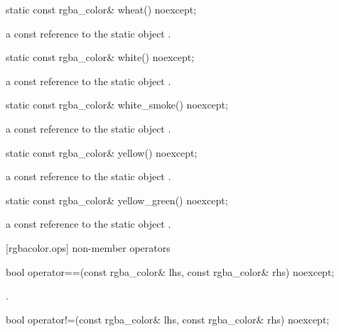 \begin{itemdecl}
static const rgba_color& wheat() noexcept;
\end{itemdecl}
\begin{itemdescr}
\pnum
\returns
a const reference to the static  object .
\end{itemdescr}

\begin{itemdecl}
static const rgba_color& white() noexcept;
\end{itemdecl}
\begin{itemdescr}
\pnum
\returns
a const reference to the static  object .
\end{itemdescr}

\begin{itemdecl}
static const rgba_color& white_smoke() noexcept;
\end{itemdecl}
\begin{itemdescr}
\pnum
\returns
a const reference to the static  object .
\end{itemdescr}

\begin{itemdecl}
static const rgba_color& yellow() noexcept;
\end{itemdecl}
\begin{itemdescr}
\pnum
\returns
a const reference to the static  object .
\end{itemdescr}

\begin{itemdecl}
static const rgba_color& yellow_green() noexcept;
\end{itemdecl}
\begin{itemdescr}
\pnum
\returns
a const reference to the static  object .
\end{itemdescr}

 [rgbacolor.ops] { non-member operators}

\begin{itemdecl}
bool operator==(const rgba_color& lhs, const rgba_color& rhs) noexcept;
\end{itemdecl}
\begin{itemdescr}
\pnum
\returns
{}.
\end{itemdescr}

\begin{itemdecl}
bool operator!=(const rgba_color& lhs, const rgba_color& rhs) noexcept;
\end{itemdecl}
\begin{itemdescr}
\pnum
\returns
{}
\end{itemdescr}
